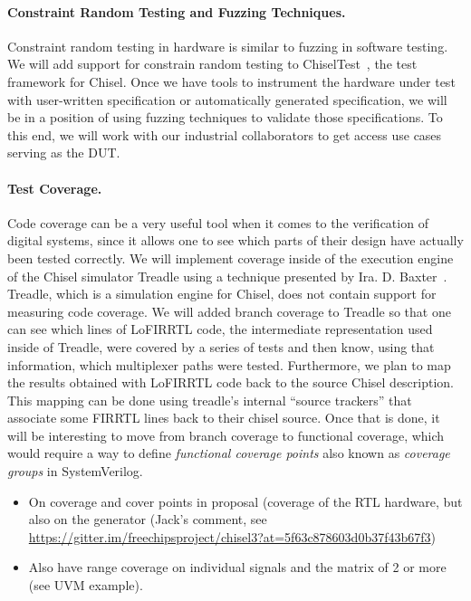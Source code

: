 \documentclass[fleqn,12pt]{article}
\begin{document}
\paragraph{Constraint Random Testing and Fuzzing Techniques.}

Constraint random testing in hardware is similar to fuzzing in software testing.
We will add support for constrain random testing to ChiselTest~\cite{chisel:tester2}, the
test framework for Chisel.
Once we have tools to instrument the hardware under test with user-written
specification or automatically generated specification, we will be in a position of using fuzzing techniques
to validate those specifications. To this end, we will work
with our industrial collaborators to get access use cases serving
as the DUT.

\paragraph{Test Coverage.}

Code coverage can be a very useful tool when it comes to the verification of digital systems,
since it allows one to see which parts of their design have actually been tested correctly. 
We will implement coverage inside of the execution engine of the Chisel simulator Treadle using a technique
presented by Ira. D. Baxter~\cite{branch-cov-made-easy:2002}.
Treadle, which is a simulation engine for Chisel, does not contain support for measuring code coverage.
We will added branch coverage to Treadle so that one can see which lines of
LoFIRRTL code, the intermediate representation used inside of Treadle, were covered by a series of tests
and then know, using that information, which multiplexer paths were tested. 
Furthermore, we plan to map the results obtained with LoFIRRTL code back to the source Chisel description.
This mapping can be done using treadle's internal ``source trackers'' that associate some FIRRTL lines back
to their chisel source. Once that is done, it will be interesting to move from branch coverage to functional
coverage, which would require a way to define \textit{functional coverage points} also known as
\textit{coverage groups} in SystemVerilog.

\begin{itemize}
\item On coverage and cover points in proposal (coverage of the RTL hardware, but also on the generator (Jack's comment, see \url{https://gitter.im/freechipsproject/chisel3?at=5f63c878603d0b37f43b67f3})
\item Also have range coverage on individual signals and the matrix of 2 or more (see UVM example).
\end{itemize}
\end{document}
